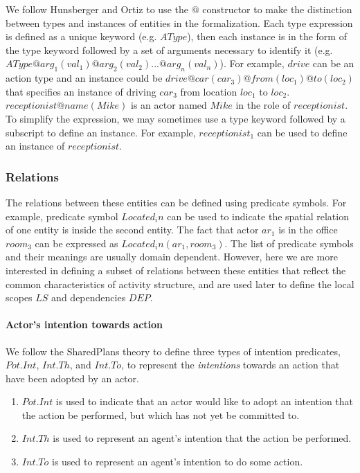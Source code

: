 We follow Hunsberger and Ortiz \cite{Hunsberger} to use the $@$ constructor to make the distinction between types and instances of entities in the formalization. Each type expression is defined as a unique keyword (e.g. $AType$), then each instance is in the form of the type keyword followed by a set of arguments necessary to identify it (e.g. $AType@arg_1(val_1)@arg_2(val_2)...@arg_n(val_n)$). For example, $drive$ can be an action type and an instance could be $drive@car(car_3)@from(loc_1)@to(loc_2)$ that specifies an instance of driving $car_3$ from location $loc_1$ to $loc_2$. $receptionist@name(Mike)$ is an actor named $Mike$ in the role of $receptionist$. To simplify the expression, we may sometimes use a type keyword followed by a subscript to define an instance. For example, $receptionist_1$ can be used to define an instance of $receptionist$.

\subsubsection{Relations} %
\label{ssub:relations}
The relations between these entities can be defined using predicate symbols. For example, predicate symbol $Located_in$ can be used to indicate the spatial relation of one entity is inside the second entity. The fact that actor $ar_1$ is in the office $room_3$ can be expressed as $Located_in(ar_1, room_3)$. The list of predicate symbols and their meanings are usually domain dependent. However, here we are more interested in defining a subset of relations between these entities that reflect the common characteristics of activity structure, and are used later to define the local scopes $LS$ and dependencies $DEP$.

\paragraph*{Actor's intention towards action} %
\label{par:relations_between_action_and_agent}
We follow the SharedPlans theory \cite{grosz1996collaborative} to define three types of intention predicates, $Pot.Int$, $Int.Th$, and $Int.To$, to represent the \emph{intentions} towards an action that have been adopted by an actor. 
\begin{enumerate}
	\item $Pot.Int$ is used to indicate that an actor would like to adopt an intention that the action be performed, but which has not yet be committed to.
	\item $Int.Th$ is used to represent an agent's intention that the action be performed.
	\item $Int.To$ is used to represent an agent's intention to do some action.
\end{enumerate}

